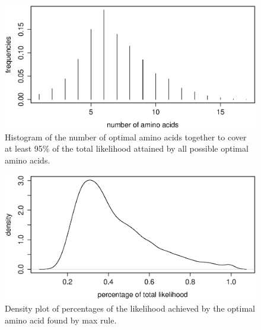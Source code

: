%


\begin{figure}[h]
\centering
\includegraphics[width=\textwidth]{AAnum.eps}
\caption{Histogram of the number of optimal amino acids together to cover at least 95\% of the total likelihood attained by all possible optimal amino acids.}
\label{fig:AAnum}
\end{figure}


\begin{figure}[h]
\centering
\includegraphics[width=\textwidth]{percentile.eps}
\caption{Density plot of percentages of the likelihood achieved by the optimal amino acid found by max rule.}
\label{fig:percentile}
\end{figure}


